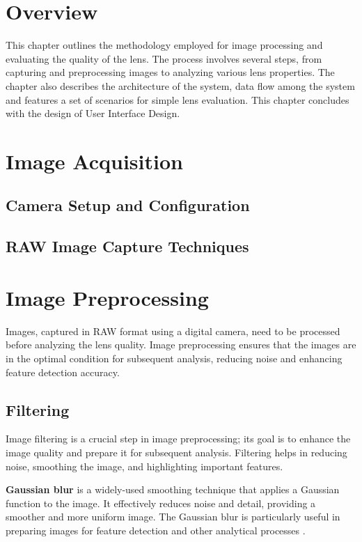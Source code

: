 \section{Overview}

This chapter outlines the methodology employed for image processing and evaluating the quality of the lens. The process involves several steps, from capturing and preprocessing images to analyzing various lens properties. The chapter also describes the architecture of the system, data flow among the system and features a set of scenarios for simple lens evaluation. This chapter concludes with the design of User Interface Design.

\section{Image Acquisition}

\subsection{Camera Setup and Configuration}

\subsection{RAW Image Capture Techniques}

\section{Image Preprocessing}
Images, captured in RAW format using a digital camera, need to be processed before analyzing the lens quality. Image preprocessing ensures that the images are in the optimal condition for subsequent analysis, reducing noise and enhancing feature detection accuracy.

\subsection{Filtering}

Image filtering is a crucial step in image preprocessing; its goal is to enhance the image quality and prepare it for subsequent analysis. Filtering helps in reducing noise, smoothing the image, and highlighting important features.

\textbf{Gaussian blur} is a widely-used smoothing technique that applies a Gaussian function to the image. It effectively reduces noise and detail, providing a smoother and more uniform image. The Gaussian blur is particularly useful in preparing images for feature detection and other analytical processes \cite{gaussian}. 

